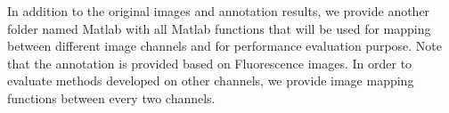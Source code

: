 In addition to the original images and annotation results, we provide another folder named Matlab with all Matlab functions that will be used for mapping between different image channels and for performance evaluation purpose.
Note that the annotation is provided based on Fluorescence images.
In order to evaluate methods developed on other channels, we provide image mapping functions between every two channels.




%
